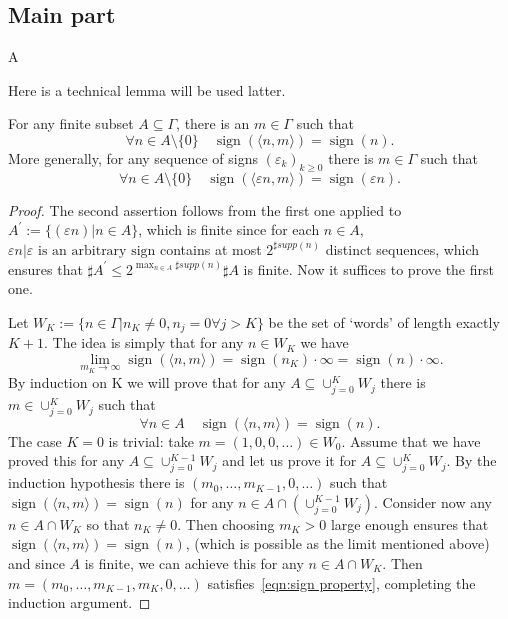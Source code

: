 \subsection{Main part}
\begin{definition}
A
\end{definition}
Here is a technical lemma will be used latter.
\begin{lemma}
    For any finite subset $A\subseteq \Gamma$, there is an $m\in\Gamma$ such that
        \[\forall n \in A\setminus\{0\}\quad \operatorname{sign}(\langle n,m\rangle)=\operatorname{sign}(n).\]
    More generally, for any sequence of signs $(\varepsilon_k)_{k\geq0}$ there is $m\in\Gamma$ such that
        \[\forall n \in A\setminus\{0\}\quad \operatorname{sign}(\langle \varepsilon n,m\rangle)=\operatorname{sign}(\varepsilon n).\]
\end{lemma}
\begin{proof}
    The second assertion follows from the first one applied to $A^{\prime}:=\{(\varepsilon n)| n\in A\}$, which is finite since for each $n\in A$, ${\varepsilon n| \varepsilon\text{ is an arbitrary sign}}$ contains 
    at most $2^{\sharp supp(n)}$ distinct sequences, which ensures that $\sharp A^{\prime}\leq 2^{\max_{n\in A}\sharp supp(n)}\sharp A$ is finite. Now it suffices to prove the first one.
    \par Let $W_K:=\{n\in\Gamma|n_K\ne0,n_j=0\forall j>K\}$ be the set of ‘words’ of length exactly $K + 1$. The idea is simply that for any $n \in W_K$ we have
        \[  \lim_{m_K\to\infty} \operatorname{sign}(\langle n,m\rangle)=\operatorname{sign}(n_K)\cdot\infty=\operatorname{sign}(n)\cdot\infty.\]
    By induction on K we will prove that for any $A\subseteq \cup_{j=0}^{K}W_j$ there is $m\in \cup_{j=0}^{K}W_j$ such that
    \begin{equation}\label{eqn:sign property}
        \forall n\in A\quad \operatorname{sign}(\langle n,m\rangle)=\operatorname{sign}(n).
    \end{equation}
    The case $K = 0$ is trivial: take $m=(1,0,0,\ldots)\in W_0$. Assume that we have proved this for any $A\subseteq \cup_{j=0}^{K-1}W_j$ and let 
    us prove it for $A\subseteq \cup_{j=0}^{K}W_j$. By the induction hypothesis there is $(m_0,\ldots,m_{K-1},0,\ldots)$ such that $\operatorname{sign}(\langle n,m\rangle)=\operatorname{sign}(n)$ 
    for any $n\in A\cap( \cup_{j=0}^{K-1}W_j )$. Consider now any $n \in A \cap W_K$ so that $n_K\ne0$. Then choosing $m_K>0$ large enough ensures that $\operatorname{sign}(\langle n,m\rangle)=\operatorname{sign}(n)$, 
    (which is possible as the limit mentioned above) and since $A$ is finite, we can achieve this for any $n\in A\cap W_K$. Then $m=(m_0,\ldots,m_{K-1},m_{K},0,\ldots)$ satisfies~\eqref{eqn:sign property}, completing the induction argument.
\end{proof}

